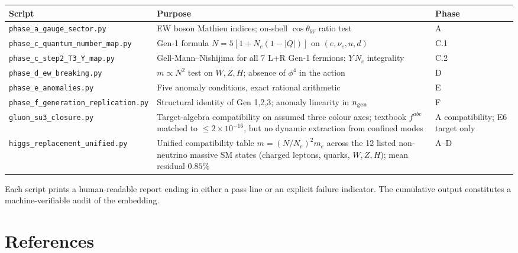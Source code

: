 \documentclass[11pt]{article}
\begin{document}
\begin{center}
\begin{tabular}{lp{}l}
\toprule
Script & Purpose & Phase \\
\midrule
\texttt{phase\_a\_gauge\_sector.py}
  & EW boson Mathieu indices; on-shell $\cos\theta_W$ ratio test
  & A \\
\texttt{phase\_c\_quantum\_number\_map.py}
  & Gen-1 formula $N=5[1+N_c(1-|Q|)]$ on $(e,\nu_e,u,d)$
  & C.1 \\
\texttt{phase\_c\_step2\_T3\_Y\_map.py}
  & Gell-Mann--Nishijima for all 7 L+R Gen-1 fermions; $Y\,N_c$ integrality
  & C.2 \\
\texttt{phase\_d\_ew\_breaking.py}
  & $m\propto N^2$ test on $W,Z,H$; absence of $\phi^4$ in the action
  & D \\
\texttt{phase\_e\_anomalies.py}
  & Five anomaly conditions, exact rational arithmetic
  & E \\
\texttt{phase\_f\_generation\_replication.py}
  & Structural identity of Gen 1,2,3; anomaly linearity in $n_{\rm gen}$
  & F \\
\texttt{gluon\_su3\_closure.py}
  & Target-algebra compatibility on assumed three colour axes;
    textbook $f^{abc}$ matched to $\leq 2\times 10^{-16}$, but no
    dynamic extraction from confined modes
  & A compatibility; E6 target only \\
\texttt{higgs\_replacement\_unified.py}
  & Unified compatibility table $m=(N/N_e)^2 m_e$ across the 12 listed
    non-neutrino massive SM states (charged leptons, quarks, $W,Z,H$);
    mean residual $0.85\%$
  & A--D \\
\bottomrule
\end{tabular}
\end{center}

Each script prints a human-readable report ending in either a
pass line or an explicit failure indicator. The cumulative
output constitutes a machine-verifiable audit of the embedding.

\clearpage
{}
\section*{References}

\end{document}
